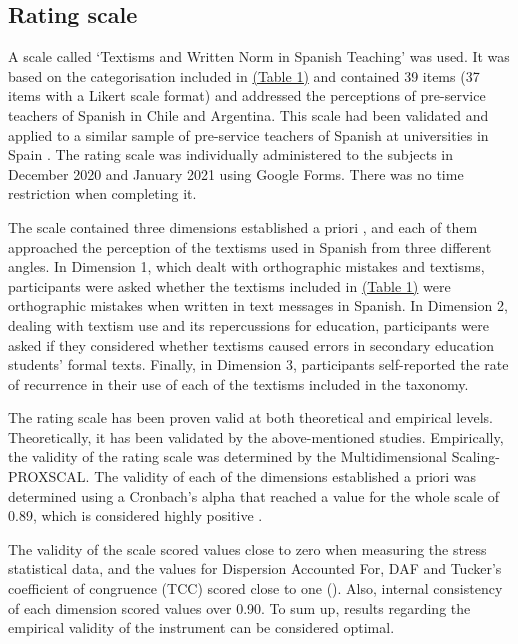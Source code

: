 \documentclass{textolivre}
\begin{document}
\subsection{Rating scale}
A scale called ‘Textisms and Written Norm in Spanish Teaching’ was used. It was based on the categorisation included in \href{tbl-tabela-01}{(Table 1)} and contained 39 items (37 items with a Likert scale format) and addressed the perceptions of pre-service teachers of Spanish in Chile and Argentina. This scale had been validated and applied to a similar sample of pre-service teachers of Spanish at universities in Spain \cite{Gomez-Camacho2018}. The rating scale was individually administered to the subjects in December 2020 and January 2021 using Google Forms. There was no time restriction when completing it.

The scale contained three dimensions established a priori \cite{Gomez-Camacho2018}, and each of them approached the perception of the textisms used in Spanish from three different angles. In Dimension 1, which dealt with orthographic mistakes and textisms, participants were asked whether the textisms included in \href{tbl-tabela-01}{(Table 1)} were orthographic mistakes when written in text messages in Spanish. In Dimension 2, dealing with textism use and its repercussions for education, participants were asked if they considered whether textisms caused errors in secondary education students’ formal texts. Finally, in Dimension 3, participants self-reported the rate of recurrence in their use of each of the textisms included in the taxonomy.

The rating scale has been proven valid at both theoretical and empirical levels. Theoretically, it has been validated by the above-mentioned studies. Empirically, the validity of the rating scale was determined by the Multidimensional Scaling-PROXSCAL. The validity of each of the dimensions established a priori was determined using a Cronbach’s alpha that reached a value for the whole scale of 0.89, which is considered highly positive \cite{Borg2013, OHare1980}.

The validity of the scale scored values close to zero when measuring the stress statistical data, and the values for Dispersion Accounted For, DAF and Tucker’s coefficient of congruence (TCC) scored close to one (). Also, internal consistency of each dimension scored values over 0.90. To sum up, results regarding the empirical validity of the instrument can be considered optimal. 
\end{document}
